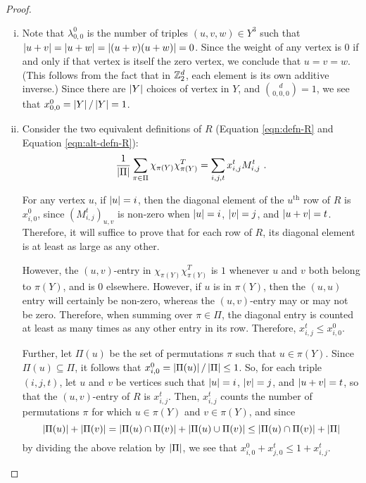 \documentclass{report}
\newcommand{\wt}[1]{\abs{ #1 }}
\newcommand{\xijt}{x_{i, j}^t}
\newcommand{\Mijt}{M_{i, j}^t}
\newcommand{\chipiY}{\chi_{\pi(Y)}}
\begin{document}
    \begin{proof} \begin{enumerate}[(i)]
      \item Note that $\lambda_{0, 0}^0$ is the number of triples $(u, v, w)
        \in Y^3$ such that $\wt{u + v} = \wt{u + w} = \wt{(u + v)(u + w)} =
        0$.  Since the weight of any vertex is $0$ if and only if that vertex
        is itself the zero vertex, we conclude that $u = v = w$.  (This
        follows from the fact that in $\mathbb{Z}_2^d$, each element is its own
        additive inverse.)  Since there are $\left\lvert Y \right\rvert$ choices of vertex in
        $Y$, and $\binom{d}{0, 0, 0} = 1$, we see that $x_{0, 0}^0 = \left\lvert Y \right\rvert /
        \left\lvert Y \right\rvert = 1$.

      \item Consider the two equivalent definitions of $R$ (Equation
        \ref{eqn:defn-R} and Equation \ref{eqn:alt-defn-R}):
        $$
          \frac{1}{\abs{\Pi}} \sum_{\pi \in \Pi} \chipiY \chipiY^T
          = \sum_{i, j, t} \xijt \Mijt \ .
        $$

        For any vertex $u$, if $\wt{u} = i$, then the diagonal element of the
        $u^\text{th}$ row of $R$ is $x_{i, 0}^0$, since $(\Mijt)_{u, v}$ is
        non-zero when $\wt{u} = i$, $\wt{v} = j$, and $\wt{u + v} = t$.
        Therefore, it will suffice to prove that for each row of $R$, its
        diagonal element is at least as large as any other.

        However, the $(u, v)$-entry in $\chipiY \chipiY^T$ is $1$ whenever $u$
        and $v$ both belong to $\pi(Y)$, and is $0$ elsewhere.  However, if $u$
        is in $\pi(Y)$, then the $(u, u)$ entry will certainly be non-zero,
        whereas the $(u, v)$-entry may or may not be zero.  Therefore, when
        summing over $\pi \in \Pi$, the diagonal entry is counted at least as
        many times as any other entry in its row.  Therefore, $\xijt \leq x_{i,
        0}^0$.  

        Further, let $\Pi(u)$ be the set of permutations $\pi$ such that $u \in
        \pi(Y)$.  Since $\Pi(u) \subseteq \Pi$, it follows that $x_{i, 0}^0 =
        \left\lvert \Pi(u) \right\rvert / \left\lvert \Pi \right\rvert \leq 1$.  So, for each triple $(i, j, t)$, let
        $u$ and $v$ be vertices such that $\wt{u} = i$, $\wt{v} = j$, and $\wt{u
        + v} = t$, so that the $(u, v)$-entry of $R$ is $\xijt$.  Then, $\xijt$
        counts the number of permutations $\pi$ for which $u \in \pi(Y)$ and $v
        \in \pi(Y)$, and since
        $$
          \left\lvert \Pi(u) \right\rvert + \left\lvert \Pi(v) \right\rvert
          = \left\lvert \Pi(u) \cap \Pi(v) \right\rvert
          + \left\lvert \Pi(u) \cup \Pi(v) \right\rvert
          \leq \left\lvert \Pi(u) \cap \Pi(v) \right\rvert
          + \left\lvert \Pi \right\rvert
        $$
        by dividing the above relation by $\left\lvert \Pi \right\rvert$, we see that $x_{i, 0}^0 +
        x_{j, 0}^t \leq 1 + \xijt$.


\end{enumerate}
\end{proof}
\end{document}
